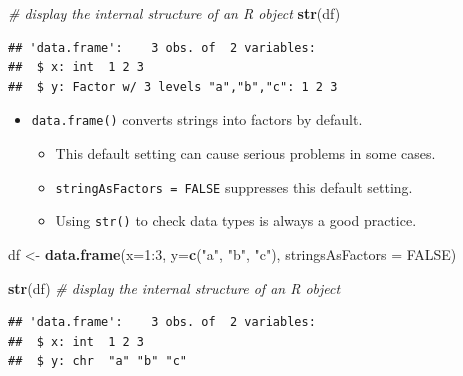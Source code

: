 \documentclass[]{book}
\newenvironment{Shaded}{\begin{snugshade}}{\end{snugshade}}
\newcommand{\KeywordTok}[1]{\textcolor[rgb]{0.13,0.29,0.53}{\textbf{{#1}}}}
\newcommand{\DataTypeTok}[1]{\textcolor[rgb]{0.13,0.29,0.53}{{#1}}}
\newcommand{\DecValTok}[1]{\textcolor[rgb]{0.00,0.00,0.81}{{#1}}}
\newcommand{\StringTok}[1]{\textcolor[rgb]{0.31,0.60,0.02}{{#1}}}
\newcommand{\CommentTok}[1]{\textcolor[rgb]{0.56,0.35,0.01}{\textit{{#1}}}}
\newcommand{\OtherTok}[1]{\textcolor[rgb]{0.56,0.35,0.01}{{#1}}}
\newcommand{\NormalTok}[1]{{#1}}
\providecommand{\tightlist}{%
  \setlength{\itemsep}{0pt}\setlength{\parskip}{0pt}}
\begin{document}
\begin{Shaded}
\begin{Highlighting}[]
\CommentTok{# display the internal structure of an R object}
\KeywordTok{str}\NormalTok{(df) }
\end{Highlighting}
\end{Shaded}

\begin{verbatim}
## 'data.frame':    3 obs. of  2 variables:
##  $ x: int  1 2 3
##  $ y: Factor w/ 3 levels "a","b","c": 1 2 3
\end{verbatim}

\begin{itemize}
\tightlist
\item
  \texttt{data.frame()} converts strings into factors by default.

  \begin{itemize}
  \tightlist
  \item
    This default setting can cause serious problems in some cases.
  \item
    \texttt{stringAsFactors\ =\ FALSE} suppresses this default setting.
  \item
    Using \texttt{str()} to check data types is always a good practice.
  \end{itemize}
\end{itemize}

\begin{Shaded}
\begin{Highlighting}[]
\NormalTok{df <-}\StringTok{ }\KeywordTok{data.frame}\NormalTok{(}\DataTypeTok{x=}\DecValTok{1}\NormalTok{:}\DecValTok{3}\NormalTok{, }\DataTypeTok{y=}\KeywordTok{c}\NormalTok{(}\StringTok{"a"}\NormalTok{, }\StringTok{"b"}\NormalTok{, }\StringTok{"c"}\NormalTok{), }\DataTypeTok{stringsAsFactors =} \OtherTok{FALSE}\NormalTok{)}
\end{Highlighting}
\end{Shaded}

\begin{Shaded}
\begin{Highlighting}[]
\KeywordTok{str}\NormalTok{(df) }\CommentTok{# display the internal structure of an R object}
\end{Highlighting}
\end{Shaded}

\begin{verbatim}
## 'data.frame':    3 obs. of  2 variables:
##  $ x: int  1 2 3
##  $ y: chr  "a" "b" "c"
\end{verbatim}
\end{document}
